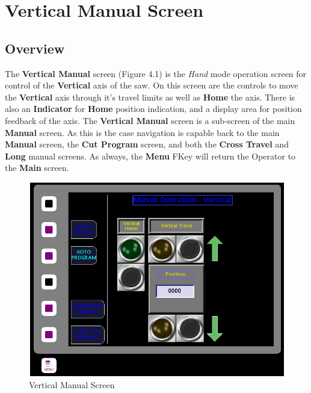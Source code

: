 \chapter{Vertical Manual Screen}
\section{Overview}The \textbf{Vertical Manual} screen (Figure 4.1) is the \textit{Hand} mode operation screen for control of the \textbf{Vertical} axis of the saw. On this screen are the controls to move the \textbf{Vertical} axis through it's travel limits as well as \textbf{Home} the axis. There is also an \textbf{Indicator} for \textbf{Home} position indication, and a display area for position feedback of the axis. The \textbf{Vertical Manual} screen is a sub-screen of the main \textbf{Manual} screen. As this is the case navigation is capable back to the main \textbf{Manual} screen, the \textbf{Cut Program} screen, and both the \textbf{Cross Travel} and \textbf{Long} manual screens. As always, the \textbf{Menu} FKey will return the Operator to the \textbf{Main} screen.
\begin{figure}
	\centering
	\includegraphics[width=0.5\linewidth]{screen-captures/vert-manual}
	\caption{Vertical Manual Screen}
	\label{fig:manual-vertical-screen}
\end{figure}
\pagebreak
\nopagebreak
